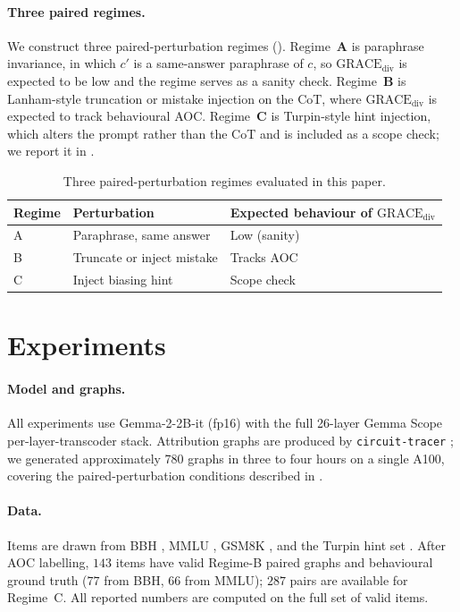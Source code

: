 \documentclass{article}
\newcommand{\gdiv}{\mathrm{GRACE}_{\text{div}}}
\begin{document}
\paragraph{Three paired regimes.}
We construct three paired-perturbation regimes ().
Regime~\textbf{A} is paraphrase invariance, in which $c'$ is a
same-answer paraphrase of $c$, so $\gdiv$ is expected to be low and the
regime serves as a sanity check. Regime~\textbf{B} is Lanham-style
truncation or mistake injection on the CoT, where $\gdiv$ is expected
to track behavioural AOC. Regime~\textbf{C} is Turpin-style hint
injection, which alters the prompt rather than the CoT and is included
as a scope check; we report it in .

\begin{table}[t]
\centering\small
\caption{Three paired-perturbation regimes evaluated in this paper.}
\label{tab:regimes}
\begin{tabular}{lll}
\toprule
Regime & Perturbation & Expected behaviour of $\gdiv$ \\
\midrule
A & Paraphrase, same answer & Low (sanity) \\
B & Truncate or inject mistake & Tracks AOC \\
C & Inject biasing hint & Scope check \\
\bottomrule
\end{tabular}
\end{table}

\section{Experiments}
\label{sec:experiments}

\paragraph{Model and graphs.}
All experiments use Gemma-2-2B-it (fp16) \citep{gemmateam2024} with the
full 26-layer Gemma Scope per-layer-transcoder stack. Attribution
graphs are produced by \texttt{circuit-tracer} \citep{hanna2025}; we
generated approximately 780 graphs in three to four hours on a single
A100, covering the paired-perturbation conditions described in
.

\paragraph{Data.}
Items are drawn from BBH \citep{suzgun2022}, MMLU
\citep{hendrycks2020mmlu}, GSM8K \citep{cobbe2021gsm8k}, and the Turpin
hint set \citep{turpin2023}. After AOC labelling, $143$ items have
valid Regime-B paired graphs and behavioural ground truth ($77$ from
BBH, $66$ from MMLU); $287$ pairs are available for Regime~C. All
reported numbers are computed on the full set of valid items.
\end{document}
